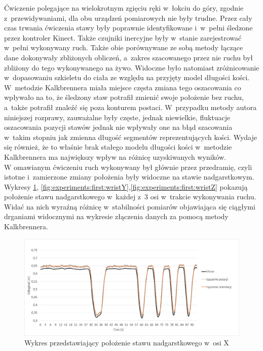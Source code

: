 Ćwiczenie polegające na wielokrotnym zgięciu ręki w~łokciu do góry, zgodnie z~przewidywaniami, dla obu urządzeń pomiarowych nie były trudne. Przez cały czas trwania ćwiczenia stawy były poprawnie identyfikowane i~w~pełni śledzone przez kontroler Kinect. Także czujniki inercyjne były w~stanie zarejestrować w~pełni  wykonywany ruch. Także obie porównywane ze sobą metody łączące dane dokonywały zbliżonych obliczeń, a~zakres szacowanego przez nie ruchu był zbliżony do tego wykonywanego na żywo. Widoczne było natomiast zróżnicowanie w~dopasowaniu szkieletu do ciała ze względu na przyjęty model długości kości. W~metodzie Kalkbrennera miała miejsce częsta zmiana tego oszacowania co wpływało na to, że śledzony staw potrafił zmienić swoje położenie bez ruchu, a~także potrafił znaleźć się poza konturem postaci. W~przypadku metody autora niniejszej rozprawy, zauważalne były częste, jednak niewielkie, fluktuacje oszacowania pozycji stawów jednak nie wpływały one na błąd szacowania w~takim stopniu jak zmienna długość segmentów reprezentujących kości. Wydaje się również, że to właśnie brak stałego modelu długości kości w~metodzie Kalkbrennera ma największy wpływ na różnicę uzyskiwanych wyników. \\

W omawianym ćwiczeniu ruch wykonywany był głównie przez przedramię, czyli istotne i~zamierzone zmiany położenia były widoczne na stawie nadgarstkowym. Wykresy \ref{fig:experiments:first:wristX}, \ref{fig:experiments:first:wristY},\ref{fig:experiments:first:wristZ} pokazują położenie stawu nadgarstkowego w~każdej z~3 osi w~trakcie wykonywania ruchu. Widać na nich wyraźną różnicę w~stabilności pomiarów objawiająca się ciągłymi drganiami widocznymi na wykresie złączenia danych za pomocą metody Kalkbrennera.

\begin{figure}[!htb]
	\centering
	\includegraphics[width=0.9\linewidth]{images/100/Slide4.png}
	\caption{Wykres przedstawiający położenie stawu nadgarstkowego w~osi X}
	\label{fig:experiments:first:wristX}
\end{figure}


